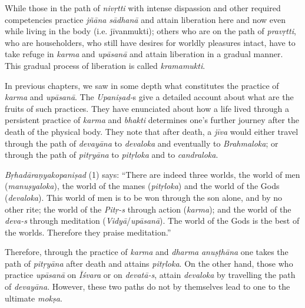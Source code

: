 While those in the path of \emph{nivṛtti} with intense dispassion and other required competencies practice \emph{jñāna} \emph{sādhanā} and attain liberation here and now even while living in the body (i.e. jīvanmukti); others who are on the path of \emph{pravṛtti}, who are householders, who still have desires for worldly pleasures intact, have to take refuge in \emph{karma} and \emph{upāsanā} and attain liberation in a gradual manner. This gradual process of liberation is called \emph{kramamukti}.

In previous chapters, we saw in some depth what constitutes the practice of \emph{karma} and \emph{upāsanā}. The \emph{Upaniṣad-}s give a detailed account about what are the fruits of such practices. They have enunciated about how a life lived through a persistent practice of \emph{karma} and \emph{bhakti} determines one's further journey after the death of the physical body. They note that after death, a \emph{jīva} would either travel through the path of \emph{devayāna} to \emph{devaloka} and eventually to \emph{Brahmaloka}; or through the path of \emph{pitṛyāna} to \emph{pitṛloka} and to \emph{candraloka}.

\emph{Bṛhadāraṇyakopaniṣad} (1) says: ``There are indeed three worlds, the world of men (\emph{manuṣyaloka}), the world of the manes (\emph{pitṛloka}) and the world of the Gods (\emph{devaloka}). This world of men is to be won through the son alone, and by no other rite; the world of the \emph{Pitṛ-s} through action (\emph{karma}); and the world of the \emph{deva-s} through meditation (\emph{Vidyā}/\emph{upāsanā}). The world of the Gods is the best of the worlds. Therefore they praise meditation.''

Therefore, through the practice of \emph{karma} and \emph{dharma} \emph{anuṣṭhāna} one takes the path of \emph{pitṛyāna} after death and attains \emph{pitṛloka}. On the other hand, those who practice \emph{upāsanā} on \emph{Īśvara} or on \emph{devatā-s}, attain \emph{devaloka} by travelling the path of \emph{devayāna}. However, these two paths do not by themselves lead to one to the ultimate \emph{mokṣa}.

